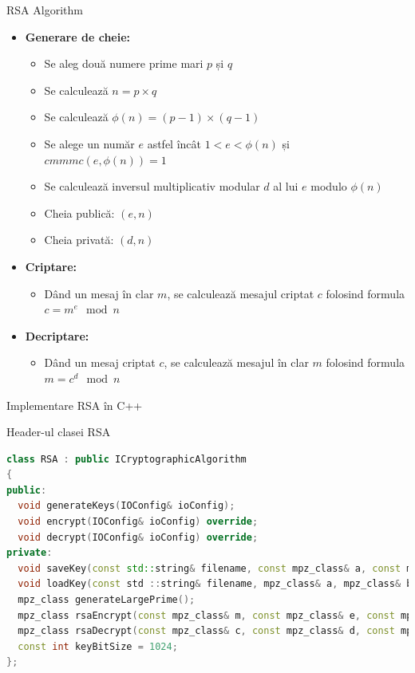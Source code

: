 \documentclass{beamer}
\begin{document}
\begin{frame}{RSA Algorithm}
  \begin{itemize}
    \item \textbf{Generare de cheie:}
    \begin{itemize}
      \item Se aleg două numere prime mari $p$ și $q$
      \item Se calculează $n = p \times q$
      \item Se calculează $\phi(n) = (p-1) \times (q-1)$
      \item Se alege un număr $e$ astfel încât $1 < e < \phi(n)$ și $cmmmc(e, \phi(n)) = 1$
      \item Se calculează inversul multiplicativ modular $d$ al lui $e$ modulo $\phi(n)$
      \item Cheia publică: $(e, n)$
      \item Cheia privată: $(d, n)$
    \end{itemize}
    \item \textbf{Criptare:}
    \begin{itemize}
      \item Dând un mesaj în clar $m$, se calculează mesajul criptat $c$ folosind formula $c = m^e \mod n$
    \end{itemize}
    \item \textbf{Decriptare:}
    \begin{itemize}
      \item Dând un mesaj criptat $c$, se calculează mesajul în clar $m$ folosind formula $m = c^d \mod n$
    \end{itemize}
  \end{itemize}
\end{frame}

\begin{frame}[fragile]{Implementare RSA în C++}
  \begin{block}{Header-ul clasei RSA}
    \begin{lstlisting}[language=C++]
class RSA : public ICryptographicAlgorithm
{
public:
  void generateKeys(IOConfig& ioConfig);
  void encrypt(IOConfig& ioConfig) override;
  void decrypt(IOConfig& ioConfig) override;
private:
  void saveKey(const std::string& filename, const mpz_class& a, const mpz_class& b);
  void loadKey(const std ::string& filename, mpz_class& a, mpz_class& b);
  mpz_class generateLargePrime();
  mpz_class rsaEncrypt(const mpz_class& m, const mpz_class& e, const mpz_class& n);
  mpz_class rsaDecrypt(const mpz_class& c, const mpz_class& d, const mpz_class& n);
  const int keyBitSize = 1024;
};
    \end{lstlisting}
  \end{block}
\end{frame}
\end{document}
